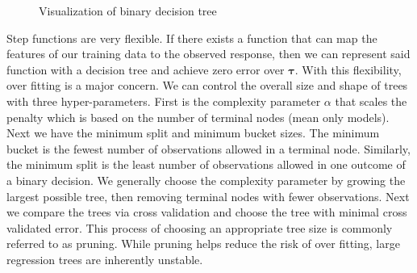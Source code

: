\documentclass[
  12pt,
  letterpaper,
  DIV=11,
  numbers=noendperiod]{scrartcl}
\newcommand{\bm}{\mathbf}
\begin{document}
\begin{figure}[H]


\caption{\label{fig-tree-examp}Visualization of binary decision tree}

\end{figure}%

Step functions are very flexible. If there exists a function that can
map the features of our training data to the observed response, then we
can represent said function with a decision tree and achieve zero error
over \(\bm \tau\). With this flexibility, over fitting is a major
concern. We can control the overall size and shape of trees with three
hyper-parameters. First is the complexity parameter \(\alpha\) that
scales the penalty which is based on the number of terminal nodes (mean
only models). Next we have the minimum split and minimum bucket sizes.
The minimum bucket is the fewest number of observations allowed in a
terminal node. Similarly, the minimum split is the least number of
observations allowed in one outcome of a binary decision. We generally
choose the complexity parameter by growing the largest possible tree,
then removing terminal nodes with fewer observations. Next we compare
the trees via cross validation and choose the tree with minimal cross
validated error. This process of choosing an appropriate tree size is
commonly referred to as pruning. While pruning helps reduce the risk of
over fitting, large regression trees are inherently unstable.
\end{document}
